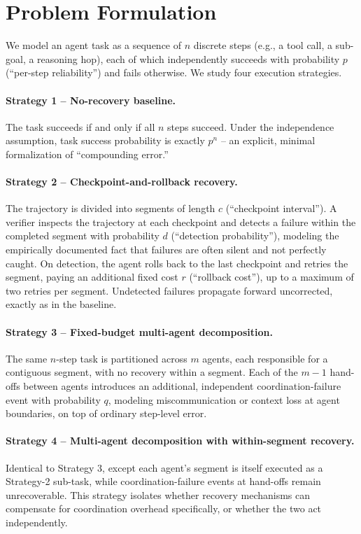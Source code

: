 \documentclass[11pt]{article}
\begin{document}
\section{Problem Formulation}
We model an agent task as a sequence of $n$ discrete steps (e.g., a tool call, a sub-goal, a reasoning hop), each of which independently succeeds with probability $p$ (``per-step reliability'') and fails otherwise. We study four execution strategies.

\paragraph{Strategy 1 -- No-recovery baseline.} The task succeeds if and only if all $n$ steps succeed. Under the independence assumption, task success probability is exactly $p^n$ -- an explicit, minimal formalization of ``compounding error.''

\paragraph{Strategy 2 -- Checkpoint-and-rollback recovery.} The trajectory is divided into segments of length $c$ (``checkpoint interval''). A verifier inspects the trajectory at each checkpoint and detects a failure within the completed segment with probability $d$ (``detection probability''), modeling the empirically documented fact that failures are often silent and not perfectly caught. On detection, the agent rolls back to the last checkpoint and retries the segment, paying an additional fixed cost $r$ (``rollback cost''), up to a maximum of two retries per segment. Undetected failures propagate forward uncorrected, exactly as in the baseline.

\paragraph{Strategy 3 -- Fixed-budget multi-agent decomposition.} The same $n$-step task is partitioned across $m$ agents, each responsible for a contiguous segment, with no recovery within a segment. Each of the $m-1$ hand-offs between agents introduces an additional, independent coordination-failure event with probability $q$, modeling miscommunication or context loss at agent boundaries, on top of ordinary step-level error.

\paragraph{Strategy 4 -- Multi-agent decomposition with within-segment recovery.} Identical to Strategy 3, except each agent's segment is itself executed as a Strategy-2 sub-task, while coordination-failure events at hand-offs remain unrecoverable. This strategy isolates whether recovery mechanisms can compensate for coordination overhead specifically, or whether the two act independently.
\end{document}
